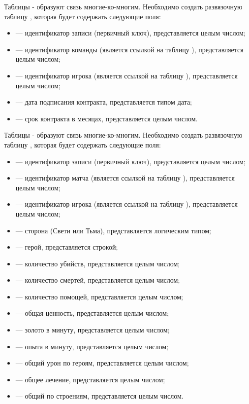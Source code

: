 Таблицы - образуют связь многие-ко-многим. Необходимо создать развязочную таблицу , которая будет содержать следующие поля:
\begin{itemize}
	\item {} --- идентификатор записи (первичный ключ), представляется целым числом;
	\item {} --- идентификатор команды (является ссылкой на таблицу ), представляется целым числом;
	\item {} --- идентификатор игрока (является ссылкой на таблицу ), представляется целым числом;
	\item {} --- дата подписания контракта, представляется типом дата;
	\item {} --- срок контракта в месяцах, представляется целым числом.
\end{itemize}

\newpage	

Таблицы - образуют связь многие-ко-многим. Необходимо создать развязочную таблицу , которая будет содержать следующие поля:
\begin{itemize}
	\item {} --- идентификатор записи (первичный ключ), представляется целым числом;
	\item {} --- идентификатор матча (является ссылкой на таблицу ), представляется целым числом;
	\item {} --- идентификатор игрока (является ссылкой на таблицу ), представляется целым числом;
	\item {} --- сторона (Свети или Тьма), представляется логическим типом;
	\item {} --- герой, представляется строкой;
	\item {} --- количество убийств, представляется целым числом;
	\item {} --- количество смертей, представляется целым числом;
	\item {} --- количество помощей, представляется целым числом;
	\item {} --- общая ценность, представляется целым числом;
	\item {} --- золото в минуту, представляется целым числом;
	\item {} --- опыта в минуту, представляется целым числом;
	\item {} --- общий урон по героям, представляется целым числом;
	\item {} --- общее лечение, представляется целым числом;
	\item {} --- общий по строениям, представляется целым числом.
\end{itemize}


